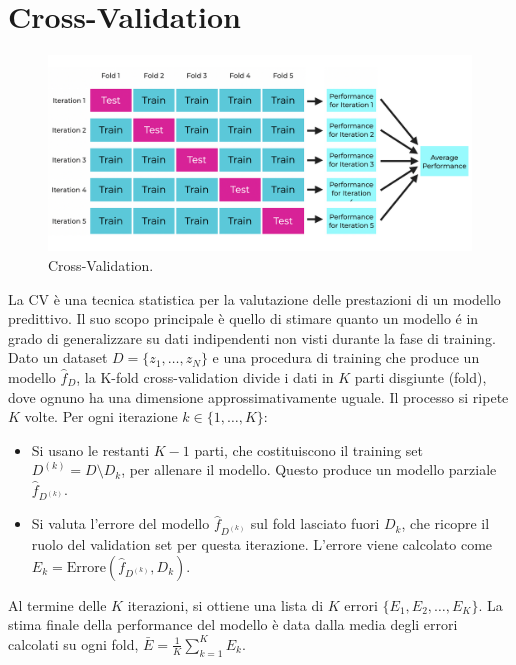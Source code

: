 \documentclass[a4paper,12pt]{report}
\begin{document}
	\section{Cross-Validation}
	\begin{figure}[H]
		\centering
		\includegraphics[width=1.0\textwidth]{img/cv.png}
		\caption{Cross-Validation.}
	\end{figure}
	La CV è una tecnica statistica per la valutazione delle prestazioni di un modello predittivo. Il suo scopo principale è quello di stimare quanto un modello é in grado di generalizzare su dati indipendenti non visti durante la fase di training. Dato un dataset $D = \{z_1, \dots, z_N\}$ e una procedura di training che produce un modello $\hat f_{D}$, la K-fold cross-validation divide i dati in $K$ parti disgiunte (fold), dove ognuno ha una dimensione approssimativamente uguale. Il processo si ripete $K$ volte. Per ogni iterazione $k \in \{1, \dots, K\}$:
	\begin{itemize}
		\item Si usano le restanti $K-1$ parti, che costituiscono il training set $D^{(k)} = D \setminus D_k$, per allenare il modello. Questo produce un modello parziale $\hat f_{D^{(k)}}$.
		\item Si valuta l'errore del modello $\hat f_{D^{(k)}}$ sul fold lasciato fuori $D_k$, che ricopre il ruolo del validation set per questa iterazione. L'errore viene calcolato come $E_k = \text{Errore}(\hat f_{D^{(k)}}, D_k)$.
	\end{itemize}
	Al termine delle $K$ iterazioni, si ottiene una lista di $K$ errori $\{E_1, E_2, \dots, E_K\}$. La stima finale della performance del modello è data dalla media degli errori calcolati su ogni fold, $\bar{E} = \frac{1}{K} \sum_{k=1}^K E_k$.
	
\end{document}
